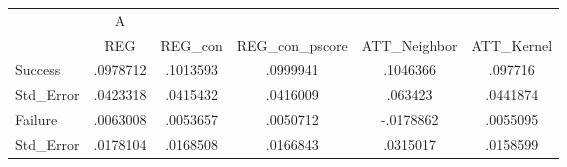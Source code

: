 \begin{tabular}{l*{5}{c}}
\hline\hline
            &           A&            &            &            &            \\
            &         REG&     REG\_con&REG\_con\_pscore&ATT\_Neighbor&  ATT\_Kernel\\
\hline
Success     &    .0978712&    .1013593&    .0999941&    .1046366&     .097716\\
Std\_Error   &    .0423318&    .0415432&    .0416009&     .063423&    .0441874\\
Failure     &    .0063008&    .0053657&    .0050712&   -.0178862&    .0055095\\
Std\_Error   &    .0178104&    .0168508&    .0166843&    .0315017&    .0158599\\
\hline\hline
\end{tabular}
